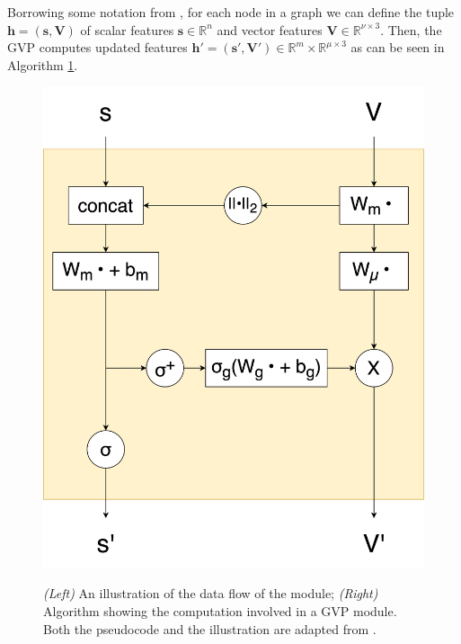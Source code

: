 Borrowing some notation from \citet{gvp1}, for each node in a graph we can define the tuple $\mathbf{h} = (\mathbf{s}, \mathbf{V})$ of scalar features $\mathbf{s}\in\mathbb{R}^{n}$ and vector features $\mathbf{V}\in \mathbb{R}^{\nu\times 3}$. Then, the GVP computes updated features $\mathbf{h}'=(\mathbf{s}', \mathbf{V}') \in \mathbb{R}^m\times\mathbb{R}^{\mu \times 3}$ as can be seen in Algorithm \ref{gvp-algo}.
\begin{figure}[!h]
    \begin{minipage}[b]{0.3\textwidth}
    \centering
    \includegraphics[width=\textwidth]{masters-report/figures/gvp.png}
    \label{fig:image}
  \end{minipage}
  \hfill
  \begin{minipage}[b]{0.65\textwidth}
    
  \end{minipage}
\caption{\textit{(Left)} An illustration of the data flow of the module; \textit{(Right)} Algorithm showing the computation involved in a GVP module.  Both the pseudocode and the illustration are adapted from \cite{gvp2}.}
\label{gvp-algo}
\end{figure}


